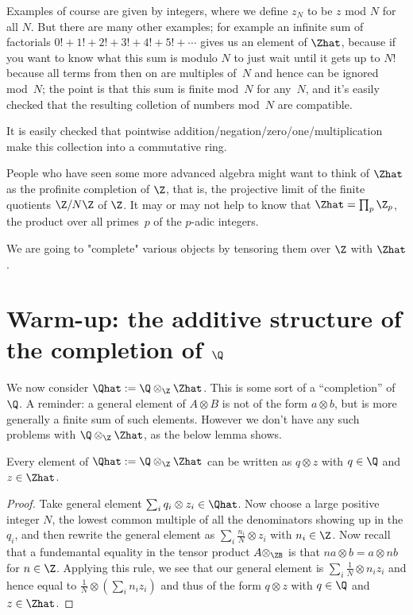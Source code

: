 Examples of course are given by integers, where we define $z_N$ to be $z$ mod $N$ for all $N$.
But there are many other examples; for example an infinite sum of factorials 
$0!+1!+2!+3!+4!+5!+\cdots$ gives us an element of $\Zhat$, because if you want to know what
this sum is modulo $N$ to just wait until it gets up to $N!$ because all terms from then on
are multiples of~$N$ and hence can be ignored mod~$N$; the point is that this sum is finite
mod~$N$ for any~$N$, and it's easily checked that the resulting colletion of numbers mod~$N$
are compatible.

It is easily checked that pointwise addition/negation/zero/one/multiplication make this
collection into a commutative ring. 

People who have seen some more advanced algebra might want to think of $\Zhat$ as
the profinite completion of $\Z$, that is, the projective limit of the finite quotients
$\Z/N\Z$ of $\Z$. It may or may not help to know that $\Zhat=\prod_p\Z_p$, the product over all
primes~$p$ of the $p$-adic integers.

We are going to "complete" various objects by tensoring them over $\Z$ with $\Zhat$.

\section{Warm-up: the additive structure of the completion of $\Q$}

We now consider $\Qhat:=\Q\otimes_{\Z}\Zhat$. This is some sort of a ``completion'' of $\Q$.
A reminder: a general element of $A\otimes B$ is not of the form $a\otimes b$, but
is more generally a finite sum of such elements. However we don't have any such
problems with $\Q\otimes_{\Z}\Zhat$, as the below lemma shows.

\begin{lemma}\label{Qhat.canonicalForm} Every element of $\Qhat:=\Q\otimes_{\Z}\Zhat$
can be written as $q\otimes z$ with $q\in\Q$ and $z\in\Zhat$.
\end{lemma}
\begin{proof} Take general element $\sum_i q_i\otimes z_i\in\Qhat$. Now choose a large 
    positive integer $N$, the lowest
common multiple of all the denominators showing up in the $q_i$, and then rewrite
the general element as $\sum_i \frac{n_i}{N}\otimes z_i$ with $n_i\in\Z$. Now recall that a fundemantal
equality in the tensor product $A\otimes_\ZB$ is that $na\otimes b=a\otimes nb$ for $n\in\Z$.
Applying this rule, we see that our general element is $\sum_i \frac{1}{N}\otimes n_i z_i$
and hence equal to $\frac{1}{N}\otimes(\sum_i n_i z_i)$ and thus of the form $q\otimes z$ with $q\in\Q$
and $z\in\Zhat$.
\end{proof}

